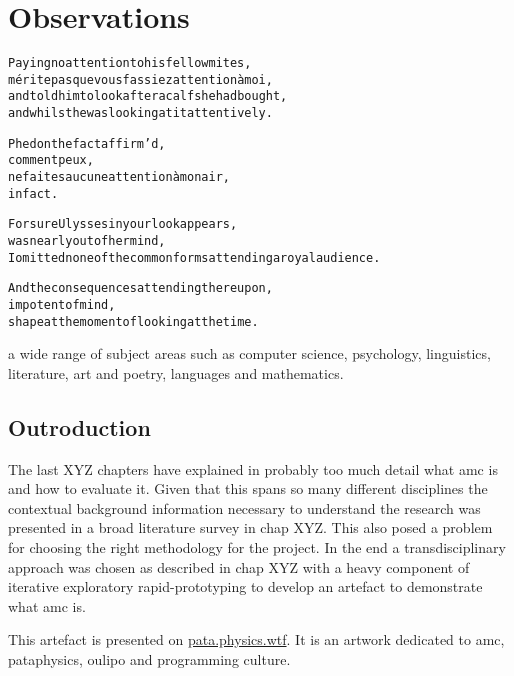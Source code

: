 
\chapter{Observations}
\label{ch:observations}

\startcontents[chapters]

\vfill

\begin{alltt}\sffamily
Paying no attention to his fellow mites,
mérite pas que vous fassiez attention à moi,
and told him to look after a calf she had bought,
and whilst he was looking at it attentively.

Phedon the fact affirm'd,
comment peux,
ne faites aucune attention à mon air,
in fact.

For sure Ulysses in your look appears,
was nearly out of her mind,
I omitted none of the common forms attending a royal audience.

And the consequences attending thereupon,
impotent of mind,
shape at the moment of looking at the time.
\end{alltt}

\newpage
\minicontents
\spirals


a wide range of subject areas such as computer science, psychology, linguistics, literature, art and poetry, languages and mathematics.


\section{Outroduction}

The last XYZ chapters have explained in probably too much detail what \gls{amc} is and how to evaluate it. Given that this spans so many different disciplines the contextual background information necessary to understand the research was presented in a broad literature survey in chap XYZ. This also posed a problem for choosing the right methodology for the project. In the end a transdisciplinary approach was chosen as described in chap XYZ with a heavy component of iterative exploratory rapid-prototyping to develop an artefact to demonstrate what \gls{amc} is. 

This artefact is presented on \url{pata.physics.wtf}. It is an artwork dedicated to \gls{amc}, pataphysics, \gls{oulipo} and programming culture.

